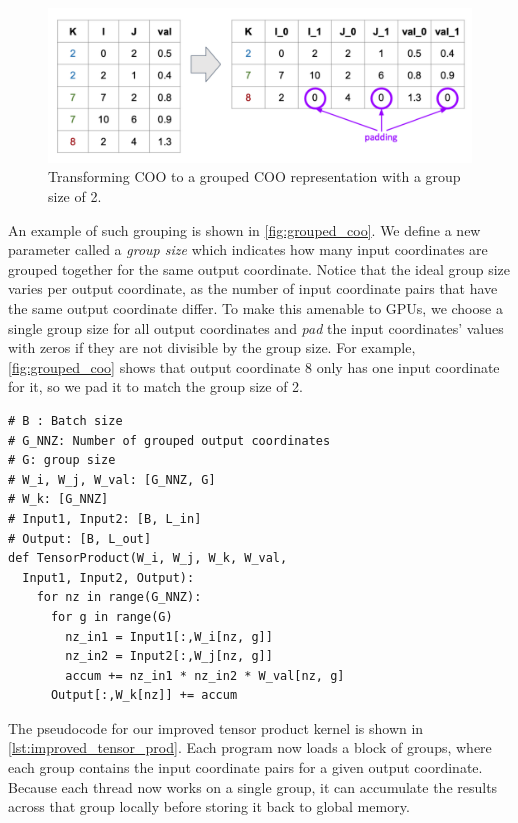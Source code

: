 \documentclass[conference]{IEEEtran}
\begin{document}
\begin{figure}
  \centering
  \includegraphics[width=1.0\linewidth]{grouped_coo.pdf}
  \caption{Transforming COO to a grouped COO representation with a group size of 2.}
  \label{fig:grouped_coo}
\end{figure}

An example of such grouping is shown in \autoref{fig:grouped_coo}.
We define a new parameter called a \textit{group size} which indicates how many input coordinates are grouped together for the same output coordinate.
Notice that the ideal group size varies per output coordinate,
as the number of input coordinate pairs that have the same output coordinate differ.
To make this amenable to GPUs,
we choose a single group size for all output coordinates and \textit{pad} the input coordinates'
values with zeros if they are not divisible by the group size.
For example, \autoref{fig:grouped_coo} shows that output coordinate 8 only has one input coordinate for it,
so we pad it to match the group size of 2.

\begin{lstlisting}[caption={Hash table lookup code.}, label={lst:improved_tensor_prod}, style=custompython]
# B : Batch size
# G_NNZ: Number of grouped output coordinates
# G: group size
# W_i, W_j, W_val: [G_NNZ, G]
# W_k: [G_NNZ]
# Input1, Input2: [B, L_in]
# Output: [B, L_out]
def TensorProduct(W_i, W_j, W_k, W_val, 
  Input1, Input2, Output):
    for nz in range(G_NNZ):
      for g in range(G)
        nz_in1 = Input1[:,W_i[nz, g]]
        nz_in2 = Input2[:,W_j[nz, g]]
        accum += nz_in1 * nz_in2 * W_val[nz, g]
      Output[:,W_k[nz]] += accum
\end{lstlisting}

The pseudocode for our improved tensor product kernel is shown in \autoref{lst:improved_tensor_prod}. Each program now loads a block of groups, where each group contains the input coordinate pairs for a given output coordinate. Because each thread now works on a single group, it can accumulate the results across that group locally before storing it back to global memory.
\end{document}
